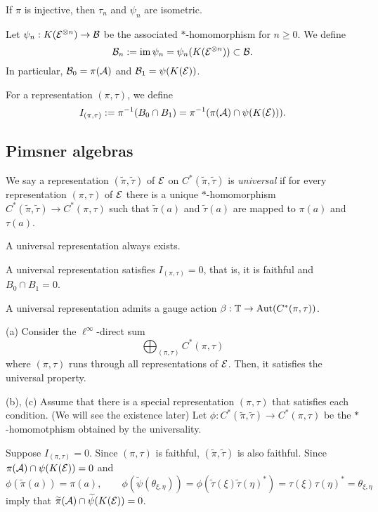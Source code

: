 \documentclass{../../small}
\begin{document}
\begin{lem}
If $\pi$ is injective, then $\tau_n$ and $\psi_n$ are isometric.
\end{lem}


\begin{defn}[Core]
Let $\psi_n:K(\mathcal{E}^{\otimes n})\to\mathcal{B}$ be the associated $*$-homomorphism for $n\ge0$.
We define
\[\mathcal{B}_n:=\operatorname{im}\psi_n=\psi_n(K(\mathcal{E}^{\otimes n}))\subset\mathcal{B}.\]
In particular, $\mathcal{B}_0=\pi(\mathcal{A})$ and $\mathcal{B}_1=\psi(K(\mathcal{E}))$.

\end{defn}


For a representation $(\pi,\tau)$, we define
\[I_{(\pi,\tau)}:=\pi^{-1}(B_0\cap B_1)=\pi^{-1}(\pi(\mathcal{A})\cap\psi(K(\mathcal{E}))).\]


\subsection{Pimsner algebras}


\begin{prop}
We say a representation $(\tilde\pi,\tilde\tau)$ of $\mathcal{E}$ on $C^*(\tilde\pi,\tilde\tau)$ is \emph{universal} if for every representation $(\pi,\tau)$ of $\mathcal{E}$ there is a unique $*$-homomorphism $C^*(\tilde\pi,\tilde\tau)\to C^*(\pi,\tau)$ such that $\tilde\pi(a)$ and $\tilde\tau(a)$ are mapped to $\pi(a)$ and $\tau(a)$.
\begin{parts}
\item A universal representation always exists.
\item A universal representation satisfies $I_{(\pi,\tau)}=0$, that is, it is faithful and $B_0\cap B_1=0$.
\item A universal representation admits a gauge action $\beta:\mathbb{T}\to\operatorname{Aut}(C^*(\pi,\tau))$.
\end{parts}
\end{prop}
\begin{pf}
(a)
Consider the $\ell^\infty$-direct sum
\[\bigoplus_{(\pi,\tau)}C^*(\pi,\tau)\]
where $(\pi,\tau)$ runs through all representations of $\mathcal{E}$.
Then, it satisfies the universal property.

(b), (c)
Assume that there is a special representation $(\pi,\tau)$ that satisfies each condition.
(We will see the existence later)
Let $\phi:C^*(\tilde\pi,\tilde\tau)\to C^*(\pi,\tau)$ be the $*$-homomotphism obtained by the universality.

Suppose $I_{(\pi,\tau)}=0$.
Since $(\pi,\tau)$ is faithful, $(\tilde\pi,\tilde\tau)$ is also faithful.
Since $\pi(\mathcal{A})\cap\psi(K(\mathcal{E}))=0$ and
\[\phi(\tilde\pi(a))=\pi(a),\qquad\phi(\tilde\psi(\theta_{\xi,\eta}))=\phi(\tilde\tau(\xi)\tilde\tau(\eta)^*)=\tau(\xi)\tau(\eta)^*=\theta_{\xi,\eta}\]
imply that $\widetilde\pi(\mathcal{A})\cap\widetilde\psi(K(\mathcal{E}))=0$.
\end{pf}
\end{document}

